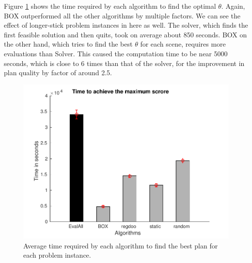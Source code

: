 Figure \ref{fig:opt_time_plot_pp} shows the time required by each algorithm
to find the optimal $\theta$. Again, BOX outperformed all the other algorithms
by multiple factors. We can see the effect of longer-stick problem instances
in here as well. The solver, which finds the first feasible solution and
then quits, took on average about 850 seconds. BOX on the other hand,
which tries to find the best $\theta$ for each scene, requires more evaluations
than Solver. This caused the computation time to be near 5000 seconds, which
is close to 6 times than that of the solver, for the improvement in plan quality
by factor of around 2.5.


\begin{figure}[htb]
\centering
\includegraphics[scale=0.5]{./figures/place_and_partial_path_opt_time_plot.pdf}
\caption{ Average time required by each algorithm to find the best plan for each problem instance. }
\label{fig:opt_time_plot_pp}
\end{figure} 
\fi

